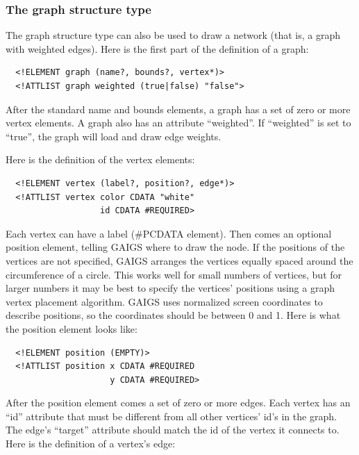 \documentclass[12pt]{article}
\begin{document}
\subsubsection{The graph structure type}

The graph structure type can also be used to draw a network (that is,
a graph with weighted edges). Here is the first part of the definition
of a graph:

\footnotesize \begin{verbatim}
  <!ELEMENT graph (name?, bounds?, vertex*)>
  <!ATTLIST graph weighted (true|false) "false">
\end{verbatim} \normalsize

After the standard name and bounds elements, a graph has a set of zero
or more vertex elements. A graph also has an attribute ``weighted''.
If ``weighted'' is set to ``true'', the graph will load and draw edge
weights.

Here is the definition of the vertex elements:

\footnotesize \begin{verbatim}
  <!ELEMENT vertex (label?, position?, edge*)>
  <!ATTLIST vertex color CDATA "white"
                   id CDATA #REQUIRED>
\end{verbatim} \normalsize
  
  Each vertex can have a label (\#PCDATA element). Then comes an
  optional position element, telling GAIGS where to draw the node. If
  the positions of the vertices are not specified, GAIGS arranges the
  vertices equally spaced around the circumference of a circle. This
  works well for small numbers of vertices, but for larger numbers it
  may be best to specify the vertices' positions using a graph vertex
  placement algorithm. GAIGS uses normalized screen coordinates to
  describe positions, so the coordinates should be between 0 and 1.
  Here is what the position element looks like:

\footnotesize \begin{verbatim}
  <!ELEMENT position (EMPTY)>
  <!ATTLIST position x CDATA #REQUIRED
                     y CDATA #REQUIRED>
\end{verbatim} \normalsize

After the position element comes a set of zero or more edges. Each
vertex has an ``id'' attribute that must be different from all other
vertices' id's in the graph. The edge's ``target'' attribute should
match the id of the vertex it connects to. Here is the definition of a
vertex's edge:
\end{document}
